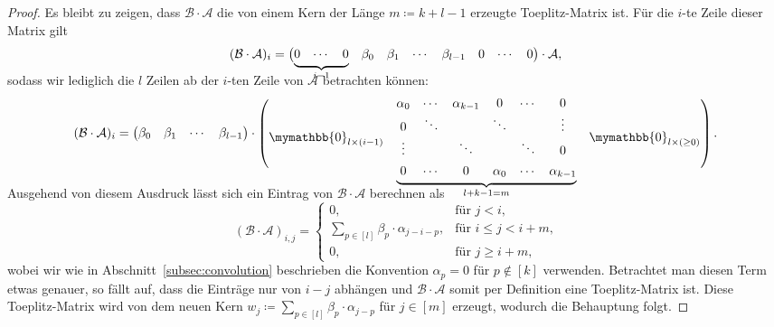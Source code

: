 \documentclass[paper=a4, 	%
		fontsize=11pt,
		abstract=true, 	%
		headsepline, 	%
		notitlepage	%
		]{scrartcl}
\theoremstyle{definition}
\newcommand{\fNat}[1]{[ #1 ]}
\begin{document}
\begin{proof}
    Es bleibt zu zeigen, dass $\mathcal{B}\cdot \mathcal{A}$ die von einem Kern der Länge $m\coloneqq k+l-1$ erzeugte Toeplitz-Matrix ist. 
    Für die $i$-te Zeile dieser Matrix gilt
    \[
        (\mathcal{B} \cdot \mathcal{A})_i
        = \begin{pmatrix}
                \smash[b]{\underbrace{\begin{matrix}0 & \cdots & 0\end{matrix}}_{i-1}} & \beta_0 & \beta_1 & \cdots & \beta_{l-1} & 0 & \cdots & 0
            \end{pmatrix} \cdot \mathcal{A}, \\[1em]
    \]
    sodass wir lediglich die $l$ Zeilen ab der $i$-ten Zeile von $\mathcal{A}$ betrachten können:
    \[
        (\mathcal{B} \cdot \mathcal{A})_i = 
            \begin{pmatrix}
                \beta_0 & \beta_1 & \cdots & \beta_{l-1}
            \end{pmatrix} \cdot \begin{pmatrix}
                \mymathbb{0}_{l\times (i-1)} & \smash[b]{\underbrace{\begin{matrix}
                    \alpha_0 & \cdots & \alpha_{k-1} & 0 & \cdots & 0 \\
                    0 & \ddots & & \ddots  & & \vdots \\
                    \vdots  & & \ddots & & \ddots & 0 \\[4pt]
                    0 & \cdots & 0 & \alpha_0 & \cdots & \alpha_{k-1} \\
            \end{matrix}}_{l + k - 1 = m}} & \mymathbb{0}_{l\times (\geq 0)}\\[2em]
        \end{pmatrix}. \\[2em]
    \]

    Ausgehend von diesem Ausdruck lässt sich ein Eintrag von $\mathcal{B}\cdot \mathcal{A}$ berechnen als
    \[
        (\mathcal{B}\cdot \mathcal{A})_{i,j} = \begin{cases}
            0, & \text{für $j < i$,}\\
            \sum_{p\in \fNat{l}} \beta_{p} \cdot \alpha_{j - i - p}, & \text{für $i \leq j < i+m$,}\\
            0, & \text{für $j \geq i+m$,}
        \end{cases}
    \]
    wobei wir wie in Abschnitt~\ref{subsec:convolution} beschrieben die Konvention $\alpha_p = 0$ für $p\notin \fNat{k}$ verwenden.
    Betrachtet man diesen Term etwas genauer, so fällt auf, dass die Einträge nur von $i-j$ abhängen und $\mathcal{B}\cdot \mathcal{A}$ somit per Definition eine Toeplitz-Matrix ist.
    Diese Toeplitz-Matrix wird von dem neuen Kern $w_j \coloneqq \sum_{p\in\fNat{l}} \beta_p \cdot \alpha_{j - p}$ für $j\in\fNat{m}$ erzeugt, wodurch die Behauptung folgt.
\end{proof}
\end{document}
